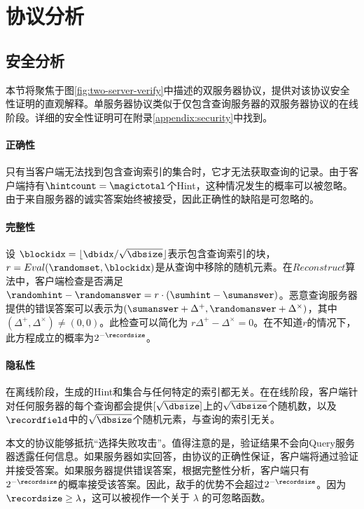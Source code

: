 \section{协议分析}

\label{sec:analysis}


\subsection{安全分析}
本节将聚焦于图\ref{fig:two-server-verify}中描述的双服务器协议，提供对该协议安全性证明的直观解释。单服务器协议类似于仅包含查询服务器的双服务器协议的在线阶段。详细的安全性证明可在附录\ref{appendix:security}中找到。

\paragraph{正确性}
只有当客户端无法找到包含查询索引的集合时，它才无法获取查询的记录。由于客户端持有$\hintcount = \magictotal$个Hint，这种情况发生的概率可以被忽略。由于来自服务器的诚实答案始终被接受，因此正确性的缺陷是可忽略的。

\paragraph{完整性}
设 $\blockidx = \lfloor \dbidx / \sqrt{\dbsize} \rfloor$表示包含查询索引的块，$r = Eval(\randomset, \blockidx)$是从查询中移除的随机元素。在$Reconstruct$算法中，客户端检查是否满足$\randomhint-\randomanswer = r \cdot (\sumhint-\sumanswer)$。恶意查询服务器提供的错误答案可以表示为$(\sumanswer+\Delta^+, \randomanswer+\Delta^\times)$，其中$(\Delta^+, \Delta^\times) \neq (0, 0)$。此检查可以简化为 $r\Delta^+ - \Delta^\times = 0$。在不知道$r$的情况下，此方程成立的概率为$2^{-\recordsize}$。

\paragraph{隐私性}
在离线阶段，生成的Hint和集合与任何特定的索引都无关。在在线阶段，客户端针对任何服务器的每个查询都会提供$[\sqrt{\dbsize}]$上的$\sqrt{\dbsize}$个随机数，以及$\recordfield$中的$\sqrt{\dbsize}$个随机元素，与查询的索引无关。

本文的协议能够抵抗“选择失败攻击”。值得注意的是，验证结果不会向Query服务器透露任何信息。如果服务器如实回答，由协议的正确性保证，客户端将通过验证并接受答案。如果服务器提供错误答案，根据完整性分析，客户端只有$2^{-\recordsize}$的概率接受该答案。因此，敌手的优势不会超过$2^{-\recordsize}$。因为 $\recordsize \ge \lambda$，这可以被视作一个关于 $\lambda$ 的可忽略函数。

